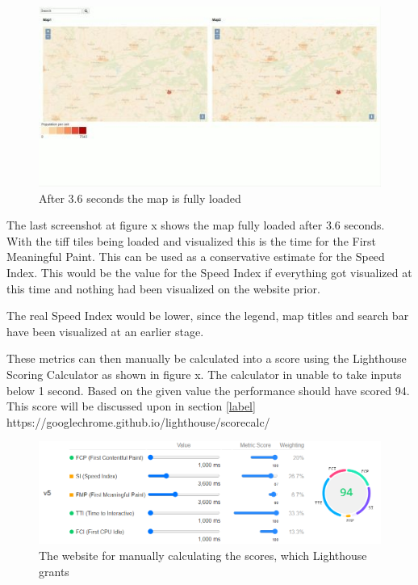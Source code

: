\begin{figure} [H]
	\centering
	\includegraphics[width=.8\textwidth]{Pictures/ScreenshotLoading3}
	\caption{After 3.6 seconds the map is fully loaded}
	\label{ScreenshotLoading3}
\end{figure}

The last screenshot at figure x shows the map fully loaded after 3.6 seconds. With the tiff tiles being loaded and visualized this is the time for the First Meaningful Paint. This can be used as a conservative estimate for the Speed Index. This would be the value for the Speed Index if everything got visualized at this time and nothing had been visualized on the website prior.

The real Speed Index would be lower, since the legend, map titles and search bar have been visualized at an earlier stage. 

These metrics can then manually be calculated into a score using the Lighthouse Scoring Calculator as shown in figure x. The calculator in unable to take inputs below 1 second. Based on the given value the performance should have scored 94. This score will be discussed upon in section \ref{label}
https://googlechrome.github.io/lighthouse/scorecalc/

\begin{figure} [H]
	\centering
	\includegraphics[width=.9\textwidth]{Pictures/ScoringManual}
	\caption{The website for manually calculating the scores, which Lighthouse grants}
	\label{ScoringManual}
\end{figure}


